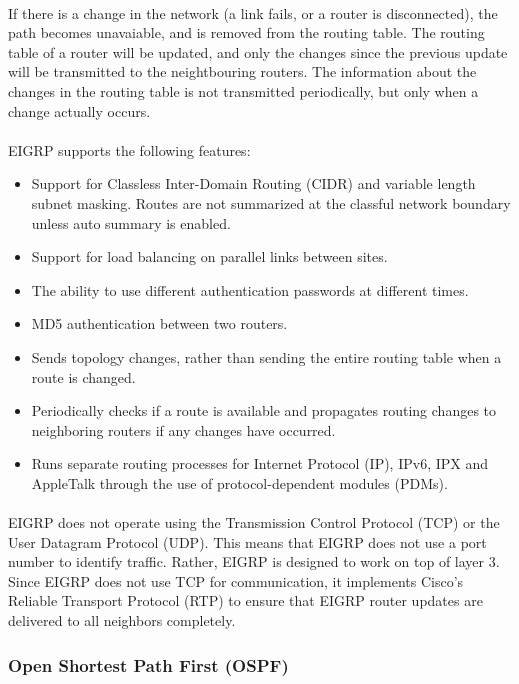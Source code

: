 \documentclass[12pt,a4paper]{report}
\begin{document}
\paragraph{}If there is a change in the network (a link fails, or a router is disconnected), the path becomes unavaiable, and is removed from the routing table. The routing table of a router will be updated, and only the changes since the previous update will be transmitted to the neightbouring routers. The information about the changes in the routing table is not transmitted periodically, but only when a change actually occurs.
\paragraph{}EIGRP supports the following features:
\begin{itemize}
\item Support for Classless Inter-Domain Routing (CIDR) and variable length subnet masking. Routes are not summarized at the classful network boundary unless auto summary is enabled.
\item Support for load balancing on parallel links between sites.
\item The ability to use different authentication passwords at different times.
\item MD5 authentication between two routers.
\item Sends topology changes, rather than sending the entire routing table when a route is changed.
\item Periodically checks if a route is available and propagates routing changes to neighboring routers if any changes have occurred.
\item Runs separate routing processes for Internet Protocol (IP), IPv6, IPX and AppleTalk through the use of protocol-dependent modules (PDMs).
\end{itemize}
\paragraph{}EIGRP does not operate using the Transmission Control Protocol (TCP) or the User Datagram Protocol (UDP). This means that EIGRP does not use a port number to identify traffic. Rather, EIGRP is designed to work on top of layer 3. Since EIGRP does not use TCP for communication, it implements Cisco's Reliable Transport Protocol (RTP) to ensure that EIGRP router updates are delivered to all neighbors completely.

\subsubsection{Open Shortest Path First (OSPF)\cite{OSPFv2}\cite{OSPFIPv6}}
\end{document}
